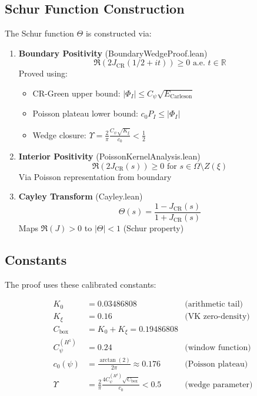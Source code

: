 \subsection{Schur Function Construction}

The Schur function $\Theta$ is constructed via:

\begin{enumerate}
    \item \textbf{Boundary Positivity} (BoundaryWedgeProof.lean)
    \begin{equation}
    \Re(2 J_{\text{CR}}(1/2 + it)) \geq 0 \text{ a.e. } t \in \mathbb{R}
    \end{equation}
    Proved using:
    \begin{itemize}
        \item CR-Green upper bound: $|\Phi_I| \leq C_\psi \sqrt{E_{\text{Carleson}}}$
        \item Poisson plateau lower bound: $c_0 P_I \leq |\Phi_I|$
        \item Wedge closure: $\Upsilon = \frac{2}{\pi} \frac{C_\psi \sqrt{K_\xi}}{c_0} < \frac{1}{2}$
    \end{itemize}
    
    \item \textbf{Interior Positivity} (PoissonKernelAnalysis.lean)
    \begin{equation}
    \Re(2 J_{\text{CR}}(s)) \geq 0 \text{ for } s \in \Omega \setminus Z(\xi)
    \end{equation}
    Via Poisson representation from boundary
    
    \item \textbf{Cayley Transform} (Cayley.lean)
    \begin{equation}
    \Theta(s) = \frac{1 - J_{\text{CR}}(s)}{1 + J_{\text{CR}}(s)}
    \end{equation}
    Maps $\Re(J) > 0$ to $|\Theta| < 1$ (Schur property)
\end{enumerate}

\subsection{Constants}

The proof uses these calibrated constants:

\begin{align}
K_0 &= 0.03486808 & \text{(arithmetic tail)}\\
K_\xi &= 0.16 & \text{(VK zero-density)}\\
C_{\text{box}} &= K_0 + K_\xi = 0.19486808\\
C_\psi^{(H^1)} &= 0.24 & \text{(window function)}\\
c_0(\psi) &= \frac{\arctan(2)}{2\pi} \approx 0.176 & \text{(Poisson plateau)}\\
\Upsilon &= \frac{2}{\pi} \frac{4 C_\psi^{(H^1)} \sqrt{C_{\text{box}}}}{c_0} < 0.5 & \text{(wedge parameter)}
\end{align}

